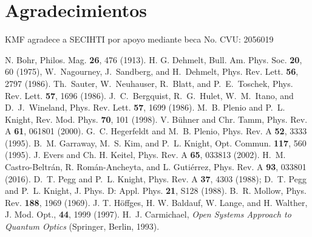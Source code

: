 \documentclass[superscriptaddress,12pt,amsmath]{revtex4-2}
\begin{document}
\section{Agradecimientos} 
KMF agradece a SECIHTI por apoyo mediante beca No. CVU: 2056019 


\begin{references} %
%
 N. Bohr, Philos. Mag. \textbf{26}, 476 (1913).   
%
 H. G. Dehmelt, Bull. Am. Phys. Soc. \textbf{20}, 60 
(1975),
%
 W.~Nagourney, J.~Sandberg, and H.~Dehmelt,  
Phys. Rev. Lett. \textbf{56}, 2797 (1986).
%
 Th.~Sauter, W.~Neuhauser, R.~Blatt, and P.~E.~Toschek,   
Phys. Rev. Lett. \textbf{57}, 1696 (1986).
%
 J.~C.~Bergquist, R.~G.~Hulet, W.~M.~Itano, and 
D.~J.~Wineland, Phys. Rev. Lett. \textbf{57}, 1699 (1986).
%
 M.~B. Plenio and P.~L. Knight, Rev. Mod. Phys. 
\textbf{70}, 101 (1998). 
%
 V. B\"uhner and Chr. Tamm, Phys. Rev. A 
	\textbf{61}, 061801 (2000). 
%
 G.~C. Hegerfeldt and M.~B. Plenio, Phys. Rev. A 
\textbf{52}, 3333 (1995). 
%
 B.~M. Garraway, M.~S. Kim, and P.~L. Knight, 
	Opt. Commun. \textbf{117}, 560 (1995).
%
 J. Evers and Ch. H. Keitel, Phys. Rev. A 
\textbf{65}, 033813 (2002). 
%
 H.~M. Castro-Beltr\'an, R. Rom\'an-Ancheyta, and 
L. Guti\'errez, Phys. Rev. A \textbf{93}, 033801 (2016). 
%
 D.~T. Pegg and P.~L. Knight, Phys. Rev. A 
\textbf{37}, 4303 (1988);  D.~T. Pegg and P.~L. Knight, J. Phys. D: 
Appl. Phys. \textbf{21}, S128 (1988). 
%
 B.~R. Mollow, Phys. Rev. \textbf{188}, 1969 (1969). 
%
 J. T. H\"offges, H. W. Baldauf, W. Lange, and 
H. Walther, J. Mod. Opt., \textbf{44}, 1999 (1997). 
%
 H.~J. Carmichael, \textit{Open Systems Approach to 
Quantum Optics} (Springer, Berlin, 1993). 
%
%
%
 

\end{references} %
\end{document}
